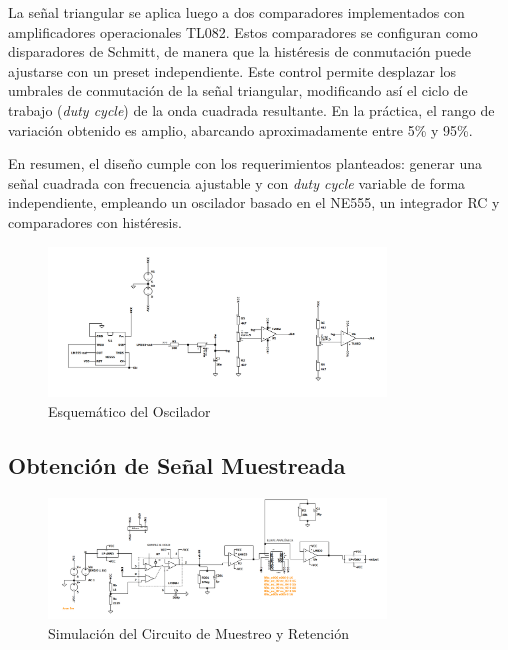 La señal triangular se aplica luego a dos comparadores implementados con amplificadores operacionales TL082. Estos comparadores se configuran como disparadores de Schmitt, de manera que la histéresis de conmutación puede ajustarse con un preset independiente. Este control permite desplazar los umbrales de conmutación de la señal triangular, modificando así el ciclo de trabajo (\textit{duty cycle}) de la onda cuadrada resultante. En la práctica, el rango de variación obtenido es amplio, abarcando aproximadamente entre 5\% y 95\%.

En resumen, el diseño cumple con los requerimientos planteados: generar una señal cuadrada con frecuencia ajustable y con \textit{duty cycle} variable de forma independiente, empleando un oscilador basado en el NE555, un integrador RC y comparadores con histéresis.
\begin{figure}[H]
    \centering
    \includegraphics[width=0.8\textwidth]{Imagenes/esquematico_oscilador.png}
    \caption{Esquemático del Oscilador}
    \label{esquematico_oscilador}
\end{figure}


\subsection{Obtención de Señal Muestreada}

\begin{figure}[H]
    \centering
    \includegraphics[width=0.8\textwidth]{Imagenes/esquematico_gral.png}
    \caption{Simulación del Circuito de Muestreo y Retención}
    \label{fig:Simulacion_Sample_and_Hold}
\end{figure}

